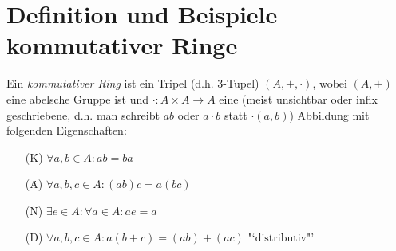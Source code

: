 \documentclass[../../main.tex]{subfiles}
\begin{document}
\section{Definition und Beispiele kommutativer Ringe}

\begin{df}\label{3.1.1}
Ein \emph{kommutativer Ring} ist ein Tripel (d.h. 3-Tupel) $(A,+,\cdot)$, wobei $(A,+)$ eine abelsche Gruppe ist und $\cdot : A\times A\to A$ eine (meist unsichtbar oder infix geschriebene, d.h. man schreibt $ab$ oder $a\cdot b$ statt $\cdot(a,b)$) Abbildung mit folgenden Eigenschaften:
\begin{itemize}
\item[(\. K)] $\forall a,b\in A: ab = ba$
\item[(\. A)] $\forall a,b,c\in A: (ab)c=a(bc)$
\item[(\. N)] $\exists e\in A : \forall a\in A: ae=a$
\item[(D)] $\forall a,b,c\in A: a(b+c) = (ab)+(ac) \text{ "`distributiv"'}$
\end{itemize}
\end{df}
\end{document}
